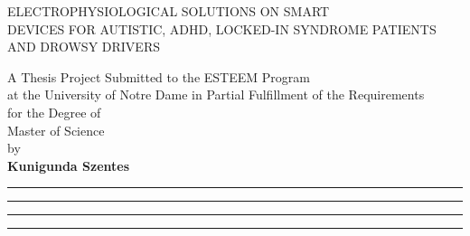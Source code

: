 \documentclass[letterpaper,10pt]{article}
\begin{document}
\pagestyle{empty}


\begin{center}
\doublespacing
\vspace{30mm}
\uppercase{\Large{Electrophysiological solutions on smart \\ devices for Autistic, ADHD, locked-in syndrome patients and drowsy drivers}}
\vspace{8mm}

\normalsize{A Thesis Project
Submitted to the ESTEEM Program\\
at the University of Notre Dame
in Partial Fulfillment of the Requirements\\
for the Degree of \\}
\vspace{8mm}
\doublespacing
\large{Master of Science}\\
by\\
\textbf{Kunigunda Szentes}\\%
\end{center}
\vspace{5mm}

\begin{flushright}
\hspace{0.3in}\noindent\rule{7cm}{0.4pt}
\end{flushright}
\vspace{4mm}

\begin{flushright}
\hspace{0.3in}\noindent\rule{7cm}{0.4pt}
\end{flushright}
\vspace{4mm}

\begin{flushright}
\hspace{0.3in}\noindent\rule{7cm}{0.4pt}
\end{flushright}
\vspace{4mm}

\begin{flushright}
\hspace{0.3in}\noindent\rule{7cm}{0.4pt}
\end{flushright}
\vspace{4mm}
\end{document}
